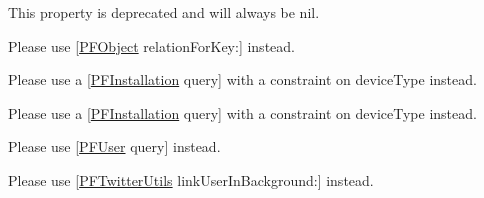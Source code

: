 \begin{DoxyRefList}
This property is deprecated and will always be nil.  
\item[\label{deprecated__deprecated000001}%
\hypertarget{deprecated__deprecated000001}{}%
Member \hyperlink{interface_p_f_object_a5fcd143c041166de62dce229299f6354}{\mbox{[}P\+F\+Object relationfor\+Key\+:\mbox{]}} ]Please use {\ttfamily \mbox{[}\hyperlink{interface_p_f_object}{P\+F\+Object} relation\+For\+Key\+:\mbox{]}} instead.  
\item[\label{deprecated__deprecated000002}%
\hypertarget{deprecated__deprecated000002}{}%
Member \hyperlink{interface_p_f_push_abb3c035bafca04776859b5162ebb2971}{\mbox{[}P\+F\+Push set\+Push\+To\+Android\+:\mbox{]}} ]Please use a {\ttfamily \mbox{[}\hyperlink{interface_p_f_installation}{P\+F\+Installation} query\mbox{]}} with a constraint on device\+Type instead.  
\item[\label{deprecated__deprecated000003}%
\hypertarget{deprecated__deprecated000003}{}%
Member \hyperlink{interface_p_f_push_a909c5f0f00ce3975508b0717f9d346f7}{\mbox{[}P\+F\+Push set\+Push\+To\+I\+O\+S\+:\mbox{]}} ]Please use a {\ttfamily \mbox{[}\hyperlink{interface_p_f_installation}{P\+F\+Installation} query\mbox{]}} with a constraint on device\+Type instead.  
\item[\label{deprecated__deprecated000004}%
\hypertarget{deprecated__deprecated000004}{}%
Member \hyperlink{interface_p_f_query_a901b050f600f4d7f7c91d1883240d79b}{\mbox{[}P\+F\+Query P\+A\+R\+S\+E\+\_\+\+D\+E\+P\+R\+E\+C\+A\+T\+E\+D\mbox{]}} ]Please use \mbox{[}\hyperlink{interface_p_f_user}{P\+F\+User} query\mbox{]} instead.  
\item[\label{deprecated__deprecated000005}%
\hypertarget{deprecated__deprecated000005}{}%
Member \hyperlink{interface_p_f_twitter_utils_a0188a34093710d9f17ad4a667c3cabb9}{\mbox{[}P\+F\+Twitter\+Utils link\+User\+:\mbox{]}} ]Please use {\ttfamily \mbox{[}\hyperlink{interface_p_f_twitter_utils}{P\+F\+Twitter\+Utils} link\+User\+In\+Background\+:\mbox{]}} instead. 
\end{DoxyRefList}